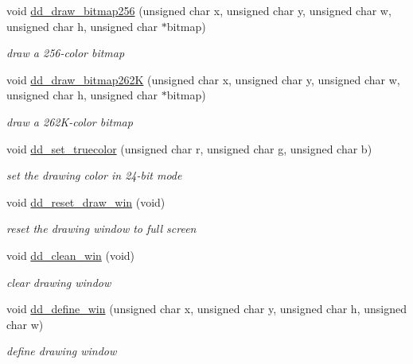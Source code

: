\begin{DoxyCompactItemize}
void \hyperlink{group__display_gae40465af03e74db8719be97f188e50ec}{dd\-\_\-draw\-\_\-bitmap256} (unsigned char x, unsigned char y, unsigned char w, unsigned char h, unsigned char $\ast$bitmap)
\begin{DoxyCompactList}\small\item\em draw a 256-\/color bitmap \end{DoxyCompactList}\item 
void \hyperlink{group__display_ga0d9fff0e64c704ca0698a3ed4ad9a324}{dd\-\_\-draw\-\_\-bitmap262\-K} (unsigned char x, unsigned char y, unsigned char w, unsigned char h, unsigned char $\ast$bitmap)
\begin{DoxyCompactList}\small\item\em draw a 262\-K-\/color bitmap \end{DoxyCompactList}\item 
void \hyperlink{group__display_ga36c5c8c7450675727113efde002c7310}{dd\-\_\-set\-\_\-truecolor} (unsigned char r, unsigned char g, unsigned char b)
\begin{DoxyCompactList}\small\item\em set the drawing color in 24-\/bit mode \end{DoxyCompactList}\item 
void \hyperlink{group__display_ga29851960a87e3aa2636a801d1e708460}{dd\-\_\-reset\-\_\-draw\-\_\-win} (void)
\begin{DoxyCompactList}\small\item\em reset the drawing window to full screen \end{DoxyCompactList}\item 
void \hyperlink{group__display_gab8af836c33fea603bb9cf83e45e5c872}{dd\-\_\-clean\-\_\-win} (void)
\begin{DoxyCompactList}\small\item\em clear drawing window \end{DoxyCompactList}\item 
void \hyperlink{group__display_ga0cc1e04b79d1fa95b3b3028ca31420f0}{dd\-\_\-define\-\_\-win} (unsigned char x, unsigned char y, unsigned char h, unsigned char w)
\begin{DoxyCompactList}\small\item\em define drawing window \end{DoxyCompactList}\end{DoxyCompactItemize}


